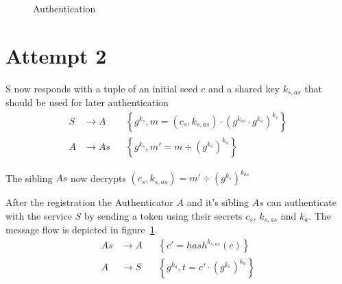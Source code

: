 



\begin{figure}
\begin{msc}{Authentication}

\setlength{\instdist}{2.5cm}
\setlength{\actionwidth}{2.6cm}

\nextlevel
{}
\nextlevel[2]
\nextlevel
{}
\nextlevel[2]
\nextlevel
{}
\nextlevel[3]
\nextlevel
{}
\nextlevel[3]
\nextlevel
{}
\nextlevel[2]
\end{msc}
\caption{}
\label{msc:authentication}
\end{figure}


\section{Attempt 2}

S now responds with a tuple of an initial seed $c$ and a shared key $k_{s,as}$ that should be used for later authentication
\begin{align}
S   &\rightarrow A      &&  \left\{g^{k_s}, m = (c_s,k_{s,as}) \cdot  \left( g^{k_{as}} \cdot g^{k_a} \right)^{k_s}\right\}\\
A   &\rightarrow As     &&  \left\{g^{k_s}, m' = m \div {\left(g^{k_s}\right)^{k_a}}\right\}
\end{align}

The sibling $As$ now decrypts $(c_s,k_{s,as}) = m' \div {\left(g^{k_s}\right)^{k_{as}}}$

After the registration the Authenticator $A$ and it's sibling $As$ can authenticate with the service $S$ by sending a token using their secrets $c_s$, $k_{s,as}$ and $k_a$. The message flow is depicted in figure~\ref{msc:authentication}.
\begin{align}
As  &\rightarrow A      &&  \left\{ c' = hash^{k_{s,as}}(c) \right\}\\
A   &\rightarrow S      &&  \left\{ g^{k_a}, t = c' \cdot \left(g^{k_s} \right)^{k_a} \right\}
\end{align}

